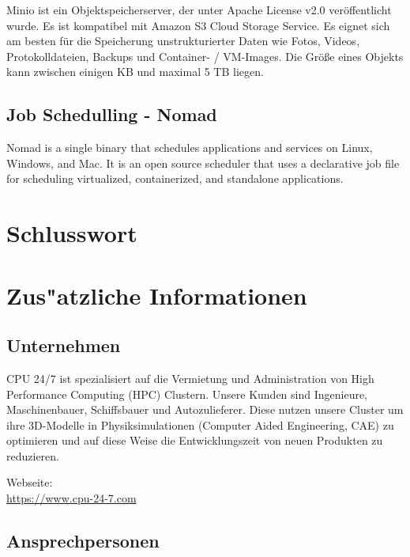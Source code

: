 \documentclass[12pt]{article}
\begin{document}
Minio ist ein Objektspeicherserver, der unter Apache License v2.0 veröffentlicht wurde. Es ist kompatibel mit Amazon S3 Cloud Storage Service. Es eignet sich am besten für die Speicherung unstrukturierter Daten wie Fotos, Videos, Protokolldateien, Backups und Container- / VM-Images. Die Größe eines Objekts kann zwischen einigen KB und maximal 5 TB liegen.

\subsection{Job Schedulling - Nomad}
Nomad is a single binary that schedules applications and services on Linux, Windows, and Mac. It is an open source scheduler that uses a declarative job file for scheduling virtualized, containerized, and standalone applications.


\newpage


\section{Schlusswort}


\newpage

\section{Zus"atzliche Informationen}
\subsection{Unternehmen}

CPU 24/7 ist spezialisiert auf die Vermietung und Administration
von High Performance Computing (HPC) Clustern.
Unsere Kunden sind Ingenieure, Maschinenbauer, Schiffsbauer und Autozulieferer.
Diese nutzen unsere Cluster um ihre 3D-Modelle in Physiksimulationen (Computer Aided Engineering, CAE)
zu optimieren und auf diese Weise die Entwicklungszeit von neuen Produkten zu reduzieren.

Webseite:\\
\url{https://www.cpu-24-7.com}



\subsection{Ansprechpersonen}
\end{document}
